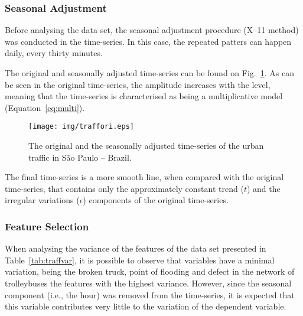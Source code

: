 \subsubsection{Seasonal Adjustment}

Before analysing the data set, the seasonal adjustment procedure (X--11 method) was conducted in the time-series. In this case, the repeated patters can happen daily, every thirty minutes. 

The original and seasonally adjusted time-series can be found on Fig.~\ref{fig:traffori}. As can be seen in the original time-series, the amplitude increases with the level, meaning that the time-series is characterised as being a multiplicative model (Equation~\eqref{eq:multi}).

\begin{figure}[htbp]
  \centering
\texttt{[image: img/traffori.eps]}
  \caption{The original and the seasonally adjusted time-series of the urban traffic in São Paulo -- Brazil.}
  \label{fig:traffori}
\end{figure}

The final time-series is a more smooth line, when compared with the original time-series, that contains only the approximately constant trend ($t$) and the irregular variations ($\epsilon$) components of the original time-series. 

\subsubsection{Feature Selection}

When analysing the variance of the features of the data set presented in Table~\ref{tab:traffvar}, it is possible to observe that variables have a minimal variation, being the broken truck, point of flooding and defect in the network of trolleybuses the features with the highest variance. However, since the seasonal component (i.e., the hour) was removed from the time-series, it is expected that this variable contributes very little to the variation of the dependent variable.

